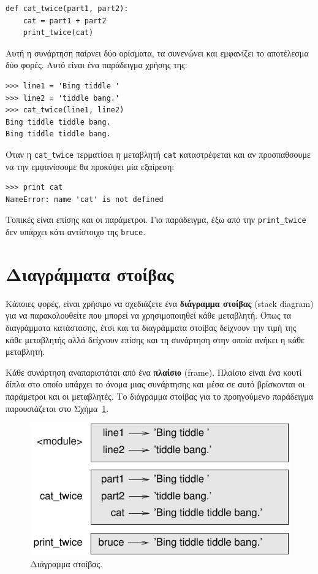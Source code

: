\documentclass[10pt]{book}
\begin{document}
\begin{verbatim}
def cat_twice(part1, part2):
    cat = part1 + part2
    print_twice(cat)
\end{verbatim}
%

Αυτή η συνάρτηση παίρνει δύο ορίσματα, τα συνενώνει και εμφανίζει το
αποτέλεσμα δύο φορές. Αυτό είναι ένα παράδειγμα χρήσης της:

\begin{verbatim}
>>> line1 = 'Bing tiddle '
>>> line2 = 'tiddle bang.'
>>> cat_twice(line1, line2)
Bing tiddle tiddle bang.
Bing tiddle tiddle bang.
\end{verbatim}
%

Όταν η \verb"cat_twice" τερματίσει η μεταβλητή {\tt cat}
καταστρέφεται και αν προσπαθσουμε να την εμφανίσουμε θα προκύψει 
μία εξαίρεση:

\begin{verbatim}
>>> print cat
NameError: name 'cat' is not defined
\end{verbatim}
%

Τοπικές είναι επίσης και οι παράμετροι. Για παράδειγμα, έξω από την  \verb"print_twice" δεν υπάρχει κάτι αντίστοιχο της {\tt bruce}.


\section{Διαγράμματα στοίβας}
\label{stackdiagram}

Κάποιες φορές, είναι χρήσιμο να σχεδιάζετε ένα {\bf διάγραμμα στοίβας} (stack diagram) για να παρακολουθείτε που μπορεί να χρησιμοποιηθεί κάθε μεταβλητή. Όπως τα διαγράμματα κατάστασης, έτσι και τα διαγράμματα στοίβας δείχνουν την τιμή της κάθε μεταβλητής αλλά δείχνουν επίσης και τη
συνάρτηση στην οποία ανήκει η κάθε μεταβλητή.

Κάθε συνάρτηση αναπαριστάται από ένα {\bf πλαίσιο} (frame). Πλαίσιο είναι ένα κουτί δίπλα στο οποίο υπάρχει το όνομα μιας συνάρτησης και μέσα σε αυτό βρίσκονται οι παράμετροι και οι μεταβλητές. Το διάγραμμα στοίβας για το
προηγούμενο παράδειγμα παρουσιάζεται στο Σχήμα~\ref{fig.stack}.


\begin{figure}
\centerline
{\includegraphics[scale=0.8]{figs/stack.pdf}}
\caption{Διάγραμμα στοίβας.}
\label{fig.stack}
\end{figure}
\end{document}
